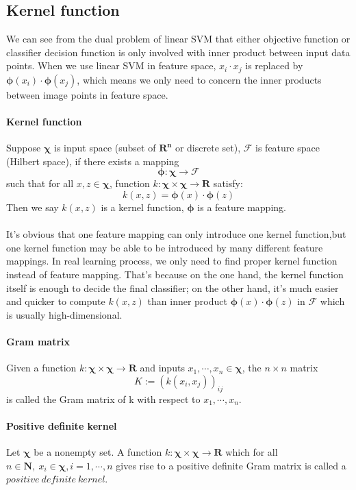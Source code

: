 \subsection{Kernel function}
We can see from the dual problem of linear SVM that either objective function or classifier decision function is only involved with inner product between input data points. When we use linear SVM in feature space, $x_{i}\cdot x_{j}$ is replaced by $\bm\phi(x_{i})\cdot \bm\phi(x_{j})$, which means we only need to concern the inner products between image points in feature space.\\

\paragraph{\textbf{Kernel function}} Suppose $\bm\chi$ is input space (subset of $\mathbf{R^n}$ or discrete set), $\mathscr{F}$ is feature space (Hilbert space), if there exists a mapping
$$\bm\phi:\bm\chi\rightarrow\mathscr{F}$$
such that for all $x,z\in \bm\chi$, function $k:\bm\chi\times\bm\chi\rightarrow\mathbf{R}$ satisfy:
$$k(x,z)=\bm\phi(x)\cdot\bm\phi(z)$$
Then we say $k(x,z)$ is a kernel function, $\bm\phi$ is a feature mapping.\\
\\
It's obvious that one feature mapping can only introduce one kernel function,but one kernel function may be able to be introduced by many different feature mappings. In real learning process, we only need to find proper kernel function instead of feature mapping. That's because on the one hand, the kernel function itself is enough to decide the final classifier; on the other hand, it's much easier and quicker to compute $k(x,z)$ than inner product $\bm\phi(x)\cdot\bm\phi(z)$ in $\mathscr{F}$ which is usually high-dimensional.\\

\paragraph{Gram matrix} Given a function $k:\bm\chi\times\bm\chi\rightarrow\mathbf{R}$ and inputs $x_{1},\cdots,x_{n}\in \bm\chi$, the $n\times n$ matrix
$$K:=(k(x_{i},x_{j}))_{ij}$$ is called the Gram matrix of k with respect to $x_{1},\cdots,x_{n}$.

\paragraph{Positive definite kernel} Let $\bm\chi$ be a nonempty set. A function $k:\bm\chi\times\bm\chi\rightarrow\mathbf{R}$ which for all $n\in \mathbf{N},\ x_{i}\in \bm\chi, i=1,\cdots,n$ gives rise to a positive definite Gram matrix is called a $positive\ definite\ kernel$.

